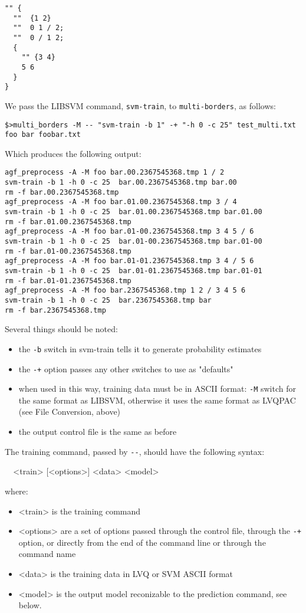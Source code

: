 \documentclass[12pt]{article}
\begin{document}
\begin{verbatim}
"" {
  ""  {1 2}
  ""  0 1 / 2;
  ""  0 / 1 2;
  {
    "" {3 4}
    5 6
  } 
} 
\end{verbatim}

We pass the LIBSVM command, \verb"svm-train", to \verb"multi-borders", as follows:

\begin{verbatim}
$>multi_borders -M -- "svm-train -b 1" -+ "-h 0 -c 25" test_multi.txt foo bar foobar.txt
\end{verbatim}

Which produces the following output:

\begin{verbatim}
agf_preprocess -A -M foo bar.00.2367545368.tmp 1 / 2
svm-train -b 1 -h 0 -c 25  bar.00.2367545368.tmp bar.00
rm -f bar.00.2367545368.tmp
agf_preprocess -A -M foo bar.01.00.2367545368.tmp 3 / 4
svm-train -b 1 -h 0 -c 25  bar.01.00.2367545368.tmp bar.01.00
rm -f bar.01.00.2367545368.tmp
agf_preprocess -A -M foo bar.01-00.2367545368.tmp 3 4 5 / 6
svm-train -b 1 -h 0 -c 25  bar.01-00.2367545368.tmp bar.01-00
rm -f bar.01-00.2367545368.tmp
agf_preprocess -A -M foo bar.01-01.2367545368.tmp 3 4 / 5 6
svm-train -b 1 -h 0 -c 25  bar.01-01.2367545368.tmp bar.01-01
rm -f bar.01-01.2367545368.tmp
agf_preprocess -A -M foo bar.2367545368.tmp 1 2 / 3 4 5 6
svm-train -b 1 -h 0 -c 25  bar.2367545368.tmp bar
rm -f bar.2367545368.tmp
\end{verbatim}

Several things should be noted:
\begin{itemize}
\item the \verb/-b/ switch in svm-train tells it to generate probability estimates
\item the \verb/-+/ option passes any other switches to use as "defaults"
\item when used in this way, training data must be in ASCII format: \verb/-M/ switch for the same format as LIBSVM, otherwise it uses the same format as LVQPAC (see File Conversion, above)
\item the output control file is the same as before
\end{itemize}

The training command, passed by \verb/--/, should have the following syntax:

\verb/  /<train> [<options>] <data> <model>

where:
\begin{itemize}
\item <train> is the training command
\item <options> are a set of options passed through the control file, through the \verb/-+/ option, or directly from the end of the command line or through the command name
\item <data> is the training data in LVQ or SVM ASCII format
\item <model> is the output model reconizable to the prediction command, see below.
\end{itemize}
\end{document}
